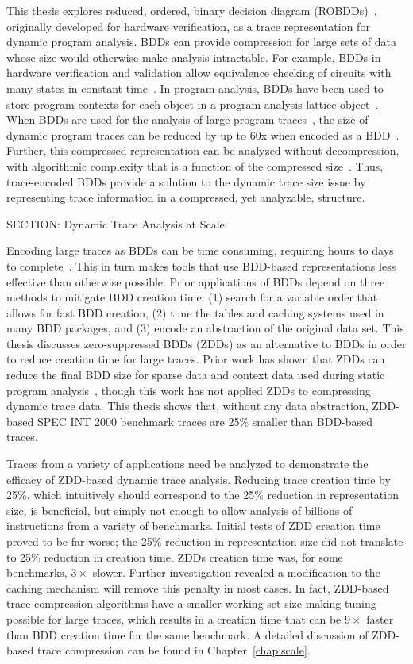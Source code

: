 {This thesis explores reduced, ordered, binary decision diagram (ROBDDs)~\cite{bryant:86:ieeetc}, originally developed for hardware verification, as a trace representation for dynamic program analysis. BDDs can provide compression for large sets of data whose size would otherwise make analysis intractable.  For example, BDDs in hardware verification and validation allow equivalence checking of circuits with many states in constant time~\cite{brayton:96:cav}.  In program analysis, BDDs have been used to store program contexts for each object in a program analysis lattice object~\cite{whaley:07:thesis}. When BDDs are used for the analysis of large program traces~\cite{price:06:cal,price:08:pact,zhang:04:icse}, the size of dynamic program traces can be reduced by up to 60x when encoded as a BDD~\cite{price:06:cal}.  Further, this compressed representation can be analyzed without decompression, with algorithmic complexity that is a function of the compressed size~\cite{price:06:cal}.  Thus, trace-encoded BDDs provide a solution to the dynamic trace size issue by representing trace information in a compressed, yet analyzable, structure.

SECTION: Dynamic Trace Analysis at Scale


Encoding large traces as BDDs can be time consuming, requiring hours to days to complete~\cite{price:08:msthesis}.  This in turn makes tools that use BDD-based representations less effective than otherwise possible.  Prior applications of BDDs depend on three methods to mitigate BDD creation time: (1) search for a variable order that allows for fast BDD creation, (2) tune the tables and caching systems used in many BDD packages, and (3) encode an abstraction of the original data set.  This thesis discusses zero-suppressed BDDs (ZDDs) as an alternative to BDDs in order to reduce creation time for large traces.  Prior work has shown that ZDDs can reduce the final BDD size for sparse data and context data used during static program analysis~\cite{minato:01:STTT, lhotak:08:lcpc}, though this work has not applied ZDDs to compressing dynamic trace data.  This thesis shows that, without any data abstraction, ZDD-based SPEC INT 2000 benchmark traces are 25\% smaller than BDD-based traces.

Traces from a variety of applications need be analyzed to demonstrate the efficacy of ZDD-based dynamic trace analysis.  Reducing trace creation time by 25\%, which intuitively should correspond to the 25\% reduction in representation size, is beneficial, but simply not enough to allow analysis of billions of instructions from a variety of benchmarks.  Initial tests of ZDD creation time proved to be far worse; the 25\% reduction in representation size did not translate to 25\% reduction in creation time.  ZDDs creation time was, for some benchmarks, $3\times$ slower.  Further investigation revealed a modification to the caching mechanism will remove this penalty in most cases.  In fact, ZDD-based trace compression algorithms have a smaller working set size making tuning possible for large traces, which results in a creation time that can be $9\times$ faster than BDD creation time for the same benchmark.  A detailed discussion of ZDD-based trace compression can be found in Chapter~\ref{chap:scale}.

}
